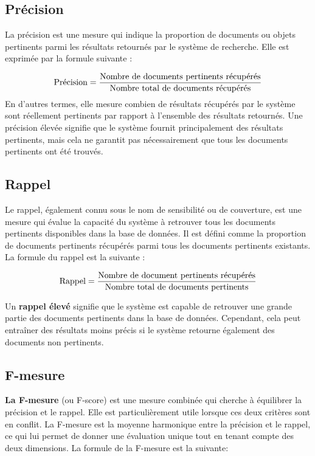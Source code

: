 \begin{section}
 \subsection{Précision}
 La précision est une mesure qui indique la proportion de documents ou objets
 pertinents parmi les résultats retournés par le système de recherche. Elle est
 exprimée par la formule suivante :

 \[
   \text{Précision} = \frac{\text{Nombre de documents pertinents récupérés}}{\text{Nombre total de documents récupérés}}
   \vspace{1cm}
 \]
 En d'autres termes, elle mesure combien de résultats récupérés par le système
 sont réellement pertinents par rapport à l'ensemble des résultats retournés.
 Une précision élevée signifie que le système fournit principalement des
 résultats pertinents, mais cela ne garantit pas nécessairement que tous les
 documents pertinents ont été trouvés.

 \subsection{Rappel}
 Le rappel, également connu sous le nom de sensibilité ou de couverture, est une
 mesure qui évalue la capacité du système à retrouver tous les documents
 pertinents disponibles dans la base de données. Il est défini comme la
 proportion de documents pertinents récupérés parmi tous les documents
 pertinents existants. La formule du rappel est la suivante :

 \[
   \text{Rappel}=\frac{\text{Nombre de document pertinents récupérés}}{\text{Nombre total de documents pertinents}}
   \vspace{1cm}
 \]

 Un \textbf{rappel élevé} signifie que le système est capable de retrouver une
 grande partie des documents pertinents dans la base de données. Cependant, cela
 peut entraîner des résultats moins précis si le système retourne également des
 documents non pertinents.
 \subsection{F-mesure}
 \textbf{La F-mesure} (ou F-score) est une mesure combinée qui cherche à équilibrer la
 précision et le rappel. Elle est particulièrement utile lorsque ces deux
 critères sont en conflit. La F-mesure est la moyenne harmonique entre la
 précision et le rappel, ce qui lui permet de donner une évaluation unique tout
 en tenant compte des deux dimensions. La formule de la F-mesure est la suivante:
 \par


\end{section}
